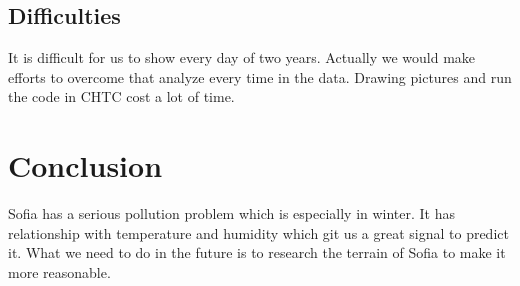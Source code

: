 \documentclass{article}
\begin{document}
\subsection{\textbf{Difficulties}}
It is difficult for us to show every day of two years. Actually we would make efforts to overcome that analyze every time in the data. Drawing pictures and run the code in CHTC cost a lot of time.

\section{Conclusion}
Sofia has a serious pollution problem which is especially in winter. It has relationship with temperature and humidity which git us a great signal to predict it. What we need to do in the future is to research the terrain of Sofia to make it more reasonable.
\end{document}
